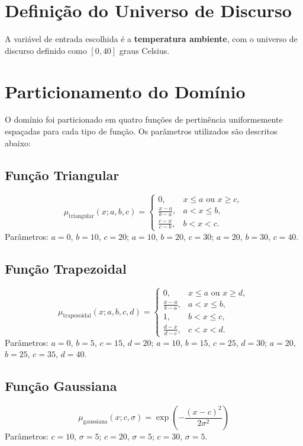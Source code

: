 \documentclass[a4paper,12pt]{article}
\begin{document}
\section{Definição do Universo de Discurso}
A variável de entrada escolhida é a \textbf{temperatura ambiente}, com o universo de discurso definido como $[0, 40]$ graus Celsius.

\section{Particionamento do Domínio}
O domínio foi particionado em quatro funções de pertinência uniformemente espaçadas para cada tipo de função. Os parâmetros utilizados são descritos abaixo:

\subsection{Função Triangular}
\[
\mu_{\text{triangular}}(x; a, b, c) =
\begin{cases}
0, & x \leq a \text{ ou } x \geq c, \\
\frac{x - a}{b - a}, & a < x \leq b, \\
\frac{c - x}{c - b}, & b < x < c.
\end{cases}
\]
Parâmetros: $a = 0$, $b = 10$, $c = 20$; $a = 10$, $b = 20$, $c = 30$; $a = 20$, $b = 30$, $c = 40$.

\subsection{Função Trapezoidal}
\[
\mu_{\text{trapezoidal}}(x; a, b, c, d) =
\begin{cases}
0, & x \leq a \text{ ou } x \geq d, \\
\frac{x - a}{b - a}, & a < x \leq b, \\
1, & b < x \leq c, \\
\frac{d - x}{d - c}, & c < x < d.
\end{cases}
\]
Parâmetros: $a = 0$, $b = 5$, $c = 15$, $d = 20$; $a = 10$, $b = 15$, $c = 25$, $d = 30$; $a = 20$, $b = 25$, $c = 35$, $d = 40$.

\subsection{Função Gaussiana}
\[
\mu_{\text{gaussiana}}(x; c, \sigma) = \exp\left(-\frac{(x - c)^2}{2\sigma^2}\right)
\]
Parâmetros: $c = 10$, $\sigma = 5$; $c = 20$, $\sigma = 5$; $c = 30$, $\sigma = 5$.
\end{document}
